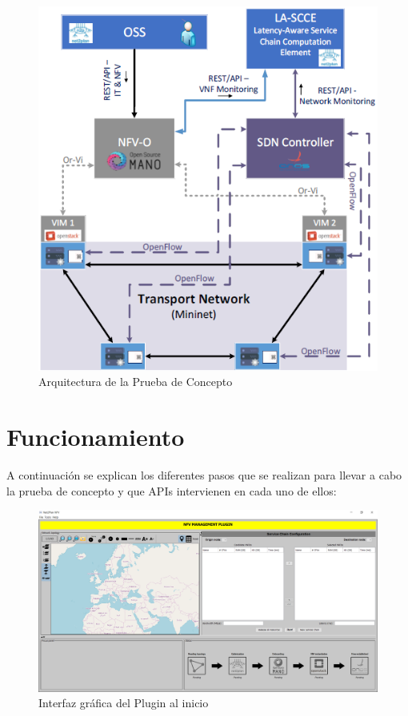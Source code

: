 \begin{figure}[!ht]
	\centering
	\includegraphics[width=0.7\linewidth]{imagenes/esquema_demo}
	\caption{Arquitectura de la Prueba de Concepto}
	\label{fig:esquemademo}
\end{figure}

\clearpage

\section{Funcionamiento}

A continuación se explican los diferentes pasos que se realizan para llevar a cabo la prueba de concepto y que APIs intervienen en cada uno de ellos:

\begin{figure}[!ht]
	\centering
	\includegraphics[width=0.7\linewidth]{imagenes/nfvplugin_dashboard}
	\caption{Interfaz gráfica del Plugin al inicio}
	\label{fig:nfvproof_inicio}
\end{figure}

